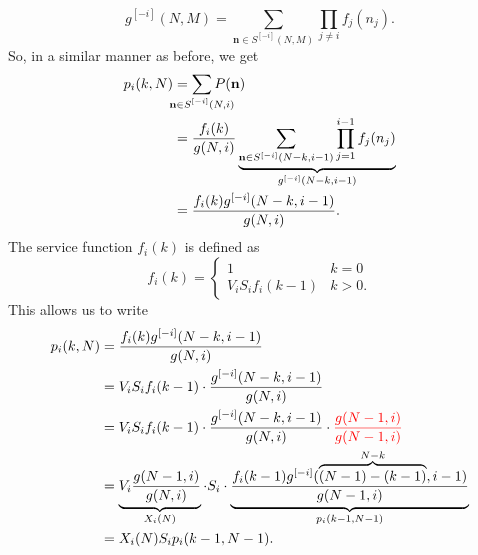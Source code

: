 \documentclass[12pt]{article}
\begin{document}
	\begin{equation*}
		g^{[-i]}(N,M)=\sum_{\mathbf{n}\in S^{[-i]}(N,M)}\prod_{{j\neq i}}f_j(n_j).
	\end{equation*}
	So, in a similar manner as before, we get
	\begin{align*}
		p_i(k,N)&=\sum_{\mathclap{\mathbf{n}\in S^{[-i]}(N,i)}}P(\mathbf{n})\\
		&=\frac{f_i(k)}{g(N,i)}\underbrace{\sum_{\mathbf{n}\in S^{[-i]}(N-k,i-1)}\prod_{j=1}^{i-1}f_j(n_j)}_{g^{[-i]}(N-k,i-1)}\\
		&=\frac{f_i(k)g^{[-i]}(N-k,i-1)}{g(N,i)}.
	\end{align*}
	The service function $f_i(k)$ is defined as
	\begin{equation*}
		f_{i}(k)=\begin{cases}
			1&k=0\\
			V_iS_if_i(k-1) &k>0.
		\end{cases}
	\end{equation*}
	This allows us to write
	\begin{align*}
		p_i(k,N) &= \frac{f_i(k)g^{[-i]}(N-k,i-1)}{g(N,i)} \\
		&= 	V_iS_if_i(k-1)\cdot\frac{g^{[-i]}(N-k,i-1)}{g(N,i)}\\
		&=V_iS_if_i(k-1)\cdot\frac{g^{[-i]}(N-k,i-1)}{g(N,i)}\cdot\color{red}\frac{g(N-1,i)}{g(N-1,i)}\\
		&=\underbrace{V_i\frac{g(N-1,i)}{g(N,i)}}_{X_i(N)}\cdot S_i\cdot\underbrace{\frac{ f_i(k-1)g^{[-i]}(\overbrace{(N-1)-(k-1)}^{N-k},i-1)}{g(N-1,i)}}_{p_i(k-1,N-1)}\\
		&=X_i(N)S_ip_i(k-1,N-1).
	\end{align*}
\end{document}
